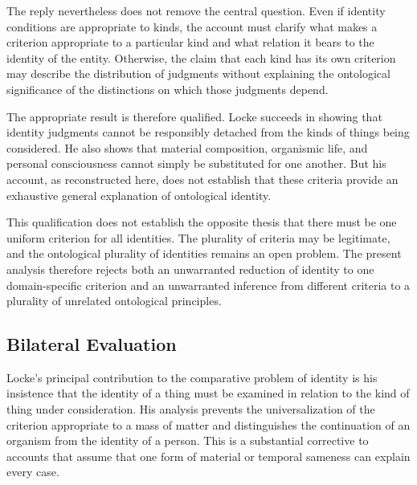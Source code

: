 \label{para:VS.B01.P01.C08.S08.SS13.P003}

The reply nevertheless does not remove the
central question. Even if identity conditions
are appropriate to kinds, the account must
clarify what makes a criterion appropriate
to a particular kind and what relation it
bears to the identity of the entity. Otherwise,
the claim that each kind has its own criterion
may describe the distribution of judgments
without explaining the ontological significance
of the distinctions on which those judgments
depend.

\label{para:VS.B01.P01.C08.S08.SS13.P004}

The appropriate result is therefore qualified.
Locke succeeds in showing that identity judgments
cannot be responsibly detached from the kinds
of things being considered. He also shows that
material composition, organismic life, and
personal consciousness cannot simply be
substituted for one another. But his account,
as reconstructed here, does not establish
that these criteria provide an exhaustive
general explanation of ontological identity.

\label{para:VS.B01.P01.C08.S08.SS13.P005}

This qualification does not establish the
opposite thesis that there must be one
uniform criterion for all identities.
The plurality of criteria may be legitimate,
and the ontological plurality of identities
remains an open problem. The present analysis
therefore rejects both an unwarranted reduction
of identity to one domain-specific criterion
and an unwarranted inference from different
criteria to a plurality of unrelated ontological
principles.



\subsection{Bilateral Evaluation}
\label{subsec:ch08-locke-evaluation}

\label{para:VS.B01.P01.C08.S08.SS14.P001}

Locke's principal contribution to the comparative
problem of identity is his insistence that the
identity of a thing must be examined in relation
to the kind of thing under consideration. His
analysis prevents the universalization of the
criterion appropriate to a mass of matter and
distinguishes the continuation of an organism
from the identity of a person. This is a
substantial corrective to accounts that assume
that one form of material or temporal sameness
can explain every case.


